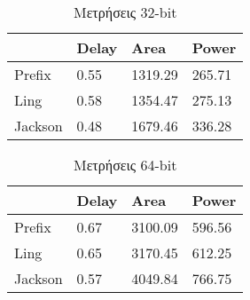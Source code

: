 \begin{multicols}{2}
\begin{table}[H]
\centering
     \begin{tabular}{||p{1.2cm} | p{0.7cm} p{1cm} p{1cm} ||} 
        \hline
        & Delay & Area & Power \\ [0.5ex] 
        \hline\hline
        Prefix  & 0.55  & 1319.29    & 265.71 \\ 
        \hline
        Ling    & 0.58  & 1354.47    & 275.13 \\
        \hline
        Jackson & 0.48  & 1679.46    & 336.28 \\
        \hline
    \end{tabular}
\caption{Μετρήσεις 32-bit}
\label{result_table_32}
\end{table}
\begin{table}[H]
\centering
     \begin{tabular}{||p{1.2cm} | p{0.7cm} p{1cm} p{1cm} ||} 
        \hline
         & Delay & Area & Power \\ [0.5ex] 
        \hline\hline
        Prefix  & 0.67  & 3100.09    & 596.56 \\ 
        \hline
        Ling    & 0.65  & 3170.45    & 612.25 \\
        \hline
        Jackson & 0.57  & 4049.84    & 766.75 \\
        \hline
    \end{tabular}
\caption{Μετρήσεις 64-bit}
\label{result_table_64}
\end{table}
\end{multicols}












